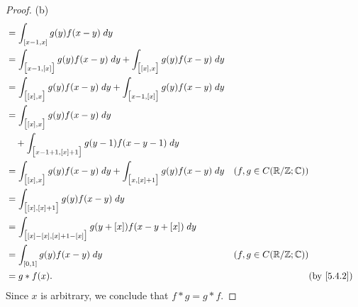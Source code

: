 \begin{proof}{(b)}
\begin{align*}
     & = \int_{[x - 1, x]} g(y) f(x - y) \; dy                                                                                                   \\
     & = \int_{\big[x - 1, [x]\big]} g(y) f(x - y) \; dy + \int_{\big[[x], x\big]} g(y) f(x - y) \; dy                                           \\
     & = \int_{\big[[x], x\big]} g(y) f(x - y) \; dy + \int_{\big[x - 1, [x]\big]} g(y) f(x - y) \; dy                                           \\
     & = \int_{\big[[x], x\big]} g(y) f(x - y) \; dy                                                                                             \\
     & \quad + \int_{\big[x - 1 + 1, [x] + 1\big]} g(y - 1) f(x - y - 1) \; dy                                                                   \\
     & = \int_{\big[[x], x\big]} g(y) f(x - y) \; dy + \int_{\big[x, [x] + 1\big]} g(y) f(x - y) \; dy & (f, g \in C(\R / \Z ; \C))              \\
     & = \int_{\big[[x], [x] + 1\big]} g(y) f(x - y) \; dy                                                                                       \\
     & = \int_{\big[[x] - [x], [x] + 1 - [x]\big]} g(y + [x]) f(x - y + [x]) \; dy                                                               \\
     & = \int_{[0, 1]} g(y) f(x - y) \; dy                                                             & (f, g \in C(\R / \Z ; \C))              \\
     & = g * f(x).                                                                                     &                            & \by{5.4.2}
  \end{align*}
  Since \(x\) is arbitrary, we conclude that \(f * g = g * f\).
\end{proof}

